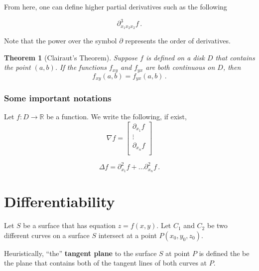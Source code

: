 \documentclass[
]{book}
\newtheorem{theorem}{Theorem}[chapter]
\theoremstyle{definition}
\theoremstyle{definition}
\theoremstyle{definition}
\theoremstyle{definition}
\theoremstyle{remark}
\begin{document}
From here, one can define higher partial derivatives such as the following

\begin{equation*}
    \partial^3_{x_1 x_2 x_2}  f\,.
\end{equation*}

Note that the power over the symbol \(\partial\) represents the order of derivatives.

\begin{theorem}[Clairaut's Theorem]
Suppose \(f\) is defined on a disk \(D\) that contains the point \((a,b)\).
If the functions \(f_{xy}\) and \(f_{yx}\) are both continuous on \(D\), then
\begin{equation*}
    f_{xy}(a,b) = f_{yx}(a,b) \,.
\end{equation*}
\end{theorem}

\subsubsection*{Some important notations}\label{some-important-notations}


Let \(f:D \to \mathbb{R}\) be a function. We write the following, if exist,
\begin{equation*}
    \nabla f = \begin{bmatrix}
        \partial_{x_1} f\\
        \vdots \\
        \partial_{x_n} f\\
    \end{bmatrix}
\end{equation*}

\begin{equation*}
    \Delta f = \partial_{x_1}^2 f + \dots \partial_{x_n}^2 f \,.
\end{equation*}

\section{Differentiability}\label{differentiability}

Let \(S\) be a surface that has equation \(z = f(x,y)\).
Let \(C_1\) and \(C_2\) be two different curves on a surface \(S\)
intersect at a point \(P(x_0, y_0, z_0)\).

Heuristically, ``the'' \textbf{tangent plane} to the surface \(S\) at point \(P\) is defined the be the plane that contains
both of the tangent lines of both curves at \(P\).
\end{document}

